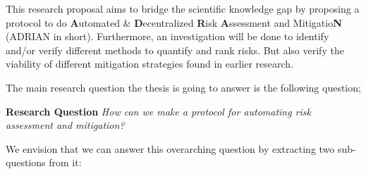This research proposal aims to bridge the scientific knowledge gap by proposing a protocol to do  \textbf{A}utomated \& \textbf{D}ecentralized \textbf{R}isk \textbf{A}ssessment and Mitigatio\textbf{N} (ADRIAN in short). Furthermore, an investigation will be done to identify and/or verify different methods to quantify and rank risks. But also verify the viability of different mitigation strategies found in earlier research. 


\vspace{1em}
The main research question the thesis is going to answer is the following question;

\textbf{Research Question}\label{rq} \emph{How can we make a protocol for automating risk assessment and mitigation?}\vspace{1em}

We envision that we can answer this overarching question by extracting two sub-questions from it:



